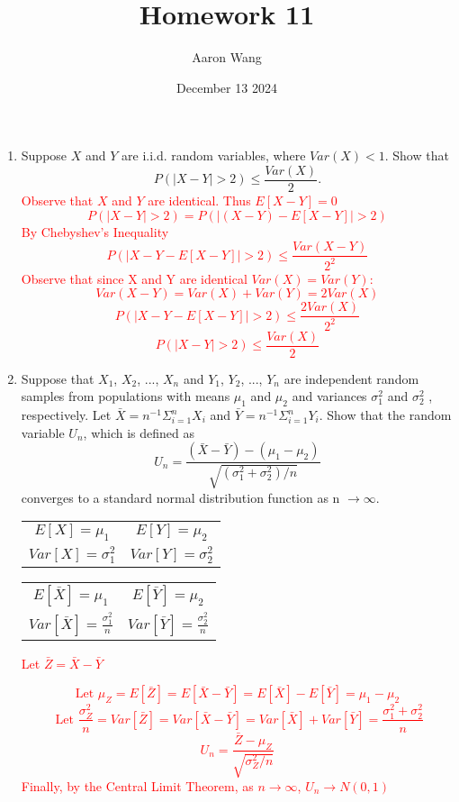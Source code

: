 \documentclass{article}
\title{Homework 11}
\author{Aaron Wang}
\date{December 13 2024}
\begin{document}
\maketitle
\begin{enumerate}
    \item Suppose $X$ and $Y$ are i.i.d. random variables, where $Var(X) < 1$. Show that
    \[
        P(|X-Y|>2) \leq \frac{Var(X)}{2}.
    \]
    \textcolor{red}{
    Observe that $X$ and $Y$ are identical. Thus $E[X-Y] = 0$
    \[P(|X-Y|>2) = P(|(X-Y)-E[X-Y]|>2)\]
    By Chebyshev's Inequality 
    \[P(|X-Y-E[X-Y]|>2) \leq \frac{Var(X-Y)}{2^2}\]
    Observe that since X and Y are identical $Var(X)=Var(Y)$:
    \[Var(X-Y) = Var(X)+ Var(Y) = 2Var(X)\]
    \[P(|X-Y-E[X-Y]|>2) \leq \frac{2Var(X)}{2^2}\]
    \[P(|X-Y|>2) \leq \frac{Var(X)}{2}\]
    }
\pagebreak
    \item Suppose that $X_1$, $X_2$, ..., $X_n$ and $Y_1$, $Y_2$, ..., $Y_n$ are independent random samples from populations with means $\mu_1$ and $\mu_2$ and variances $\sigma^2_1$ and $\sigma^2_2$ , respectively. Let $\bar{X} = n^{-1}\Sigma^n_{i=1} X_i$ and $\bar{Y} = n^{-1}\Sigma^n_{i=1} Y_i$. Show that the random variable $U_n$, which is defined as
    \[
        U_n = \frac{(\bar{X} - \bar{Y})-(\mu_1-\mu_2)}{\sqrt{(\sigma^2_1 +\sigma^2_2)/n}}
    \]
    converges to a standard normal distribution function as n $\rightarrow \infty$.
    \textcolor{red}{
    \begin{center}
        \begin{tabular}{c c}
         $E[X] = \mu_1$ & $E[Y] = \mu_2$ \\
         $Var[X] = \sigma_1^2$ & $Var[Y] = \sigma_2^2$
    \end{tabular}
    \end{center}
    \begin{center}
    \begin{tabular}{c c}
         $E[\bar{X}] = \mu_1$ & $E[\bar{Y}] = \mu_2$ \\
         $Var[\bar{X}] = \frac{\sigma_1^2}{n}$ & $Var[\bar{Y}] = \frac{\sigma_2^2}{n}$
    \end{tabular}
    Let $\bar{Z} = \bar{X}-\bar{Y}$
    \end{center}
    \[
        \text{Let } \mu_Z = E[\bar{Z}] = E[\bar{X}-\bar{Y}] = E[\bar{X}]-E[\bar{Y}]=\mu_1 - \mu_2
    \]
    \[
        \text{ Let } \frac{\sigma_Z^2}{n} = Var[\bar{Z}] = Var[\bar{X}-\bar{Y}] = Var[\bar{X}] + Var[\bar{Y}] = \frac{\sigma_1^2 + \sigma_2^2}{n}
    \]
    \[
        U_n = \frac{\bar{Z}-\mu_Z}{\sqrt{\sigma_Z^2/n}}
    \]
    Finally, by the Central Limit Theorem, as $n \to \infty$, $U_n \to N(0,1)$
    }
    

\end{enumerate}
\end{document}
